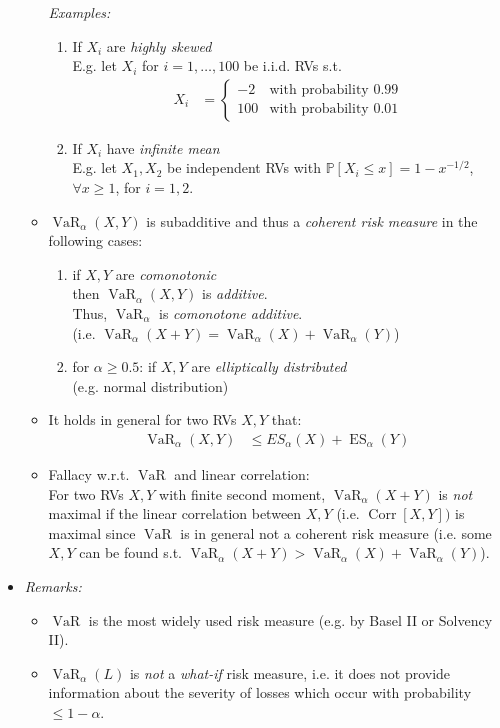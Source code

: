 \documentclass[a4paper,landscape,8pt,fleqn]{scrartcl}
\DeclareMathOperator{\Corr}{Corr}				%
\DeclareMathOperator{\VaR}{VaR}				%
\DeclareMathOperator{\ES}{ES}					%
\begin{document}
\begin{multicols*}{3}
\begin{itemize}
\begin{itemize}
\textit{Examples:}
\begin{enumerate}
\item If $X_i$ are \textit{highly skewed} \\
E.g. let $X_i$ for $i = 1, \ldots, 100$ be i.i.d. RVs s.t.
\begin{align*}
X_i &=
\begin{cases}
-2 & \text{with probability } 0.99 \\
100 & \text{with probability } 0.01
\end{cases}
\end{align*}
\item If $X_i$ have \textit{infinite mean} \\
E.g. let $X_1, X_2$ be independent RVs with $\mathbb{P}[X_i \leq x] = 1-x^{-1/2}$, $\forall x \geq 1$, for $i=1,2$.
\end{enumerate}
\item $\VaR_\alpha(X,Y)$ is subadditive and thus a \textit{coherent risk measure} in the following cases:
\begin{enumerate}
\item if $X, Y$ are \textit{comonotonic} \\
then $\VaR_\alpha(X,Y)$ is \textit{additive}. \\
Thus, $\VaR_\alpha$ is \textit{comonotone additive}. \\
(i.e. $\VaR_\alpha(X+Y) = \VaR_\alpha(X) + \VaR_\alpha(Y)$)
\item for $\alpha \geq 0.5$: if $X,Y$ are \textit{elliptically distributed} \\
(e.g. normal distribution)
\end{enumerate}
\item It holds in general for two RVs $X,Y$ that:
\begin{align*}
\VaR_\alpha(X,Y) &\leq ES_\alpha(X) + \ES_\alpha(Y)
\end{align*}
\item Fallacy w.r.t. $\VaR$ and linear correlation: \\
For two RVs $X,Y$ with finite second moment, $\VaR_\alpha(X+Y)$ is \textit{not} maximal if the linear correlation between $X,Y$ (i.e. $\Corr[X,Y])$ is maximal since $\VaR$ is in general not a coherent risk measure (i.e. some $X,Y$ can be found s.t. $\VaR_\alpha(X+Y) > \VaR_\alpha(X) + \VaR_\alpha(Y)$).
\end{itemize}
\item \textit{Remarks:}
\begin{itemize}
\item $\VaR$ is the most widely used risk measure (e.g. by Basel II or Solvency II).
\item $\VaR_\alpha(L)$ is \textit{not} a \textit{what-if} risk measure, i.e. it does not provide information about the severity of losses which occur with probability $\leq 1-\alpha$.
\end{itemize}
\end{itemize}


\end{multicols*}
\end{document}
